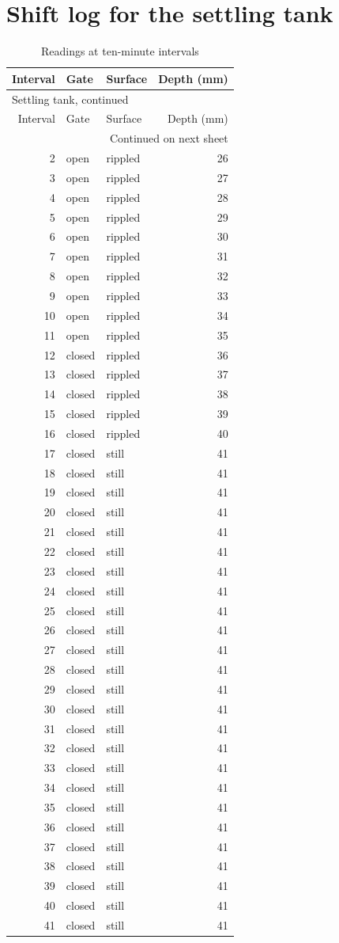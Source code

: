 \documentclass{article}
\begin{document}
\section*{Shift log for the settling tank}

\begin{longtable}{rllr}
\caption{Readings at ten-minute intervals}\\
Interval&Gate&Surface&Depth (mm)\\\hline\endfirsthead
\multicolumn{4}{l}{Settling tank, continued}\\
Interval&Gate&Surface&Depth (mm)\\\hline\endhead
\hline\multicolumn{4}{r}{Continued on next sheet}\endfoot
\hline\endlastfoot
1&open&rippled&25\\
2&open&rippled&26\\
3&open&rippled&27\\
4&open&rippled&28\\
5&open&rippled&29\\
6&open&rippled&30\\
7&open&rippled&31\\
8&open&rippled&32\\
9&open&rippled&33\\
10&open&rippled&34\\
11&open&rippled&35\\
12&closed&rippled&36\\
13&closed&rippled&37\\
14&closed&rippled&38\\
15&closed&rippled&39\\
16&closed&rippled&40\\
17&closed&still&41\\
18&closed&still&41\\
19&closed&still&41\\
20&closed&still&41\\
21&closed&still&41\\
22&closed&still&41\\
23&closed&still&41\\
24&closed&still&41\\
25&closed&still&41\\
26&closed&still&41\\
27&closed&still&41\\
28&closed&still&41\\
29&closed&still&41\\
30&closed&still&41\\
31&closed&still&41\\
32&closed&still&41\\
33&closed&still&41\\
34&closed&still&41\\
35&closed&still&41\\
36&closed&still&41\\
37&closed&still&41\\
38&closed&still&41\\
39&closed&still&41\\
40&closed&still&41\\
41&closed&still&41\\\end{longtable}
\end{document}
